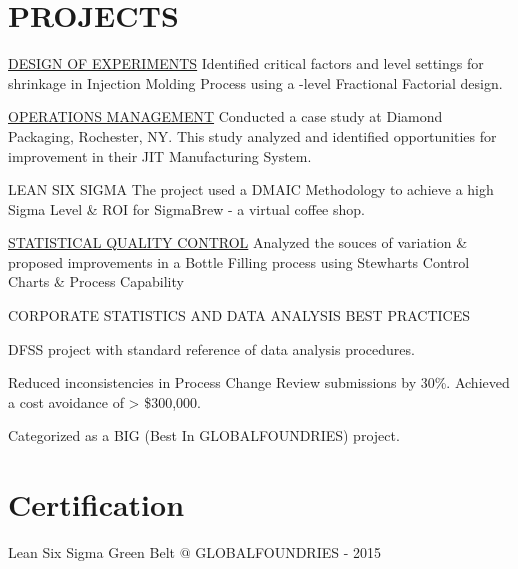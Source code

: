 \documentclass[]{bigfatnoob-resume}
\begin{document}
\begin{minipage}[t]{0.66\textwidth}
\section{PROJECTS}
\location{}
\begin{tightemize}
\item \href{http://sandeepmohan.com/files/DOE_Simulation.pdf}{\ibf DESIGN OF EXPERIMENTS} Identified critical factors and level settings for shrinkage in Injection Molding Process using a {-level Fractional Factorial design}. 
\item \href{http://sandeepmohan.com/files/JIT_At_Diamond_Packaging.pdf}{\ibf OPERATIONS MANAGEMENT} Conducted a case study at Diamond Packaging, Rochester, NY. This study analyzed and identified opportunities for improvement in their {\ibf JIT} Manufacturing System.
\item {\ibf LEAN SIX SIGMA} The project used a {\ibf DMAIC} Methodology to achieve a high {\ibf Sigma Level} \& {\ibf ROI} for SigmaBrew - a virtual coffee shop.
\item \href{http://sandeepmohan.com/files/SQC_Bottle_filling.pdf}{\ibf STATISTICAL QUALITY CONTROL} Analyzed the souces of variation \& proposed improvements in a Bottle Filling process using {\ibf Stewharts Control Charts} \& {\ibf Process Capability}
\end{tightemize}
\sectionsep

\location{}
\begin{tightemize}
\item {\ibf CORPORATE STATISTICS AND DATA ANALYSIS BEST PRACTICES}
\begin{tightemize}
\vspace{\topsep}
\item {\ibf DFSS} project with standard reference of data analysis procedures.
\item  Reduced inconsistencies in Process Change Review submissions by 30\%. Achieved a cost avoidance of > \$300,000.
\item Categorized as a {\ibf BIG (Best In GLOBALFOUNDRIES)} project.
\end{tightemize}
\end{tightemize}
\sectionsep


\section{Certification}
\vspace{\topsep}
\begin{tightemize}
\item Lean Six Sigma {\ibf Green Belt} $@$ GLOBALFOUNDRIES - 2015
\end{tightemize}


\end{minipage}
\end{document}
